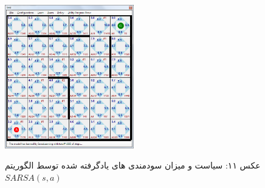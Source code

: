 \documentclass[10pt,a4paper]{article}
\begin{document}
\begin{figure}[H]
    \centering
    \includegraphics[width=0.5\textwidth]{r}
    \begin{center}
    \textarabic{عکس ۱۱: سیاست و میزان سودمندی های یادگرفته شده توسط الگوریتم $SARSA(s, a)$ }
    \end{center}
\end{figure}
\end{document}
